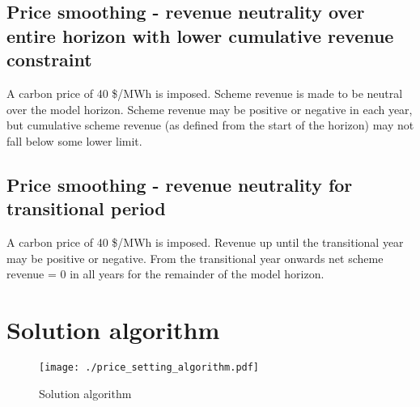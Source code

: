 \documentclass{article}
\begin{document}
\subsection{Price smoothing - revenue neutrality over entire horizon with lower cumulative revenue constraint}
A carbon price of 40 \$/MWh is imposed. Scheme revenue is made to be neutral over the model horizon. Scheme revenue may be positive or negative in each year, but cumulative scheme revenue (as defined from the start of the horizon) may not fall below some lower limit. 


\subsection{Price smoothing - revenue neutrality for transitional period}
A carbon price of 40 \$/MWh is imposed. Revenue up until the transitional year may be positive or negative. From the transitional year onwards net scheme revenue = 0 in all years for the remainder of the model horizon.

\section{Solution algorithm}

\begin{figure}
	\centering
	\texttt{[image: ./price\_setting\_algorithm.pdf]}
	\caption{Solution algorithm}
\end{figure}
\end{document}
